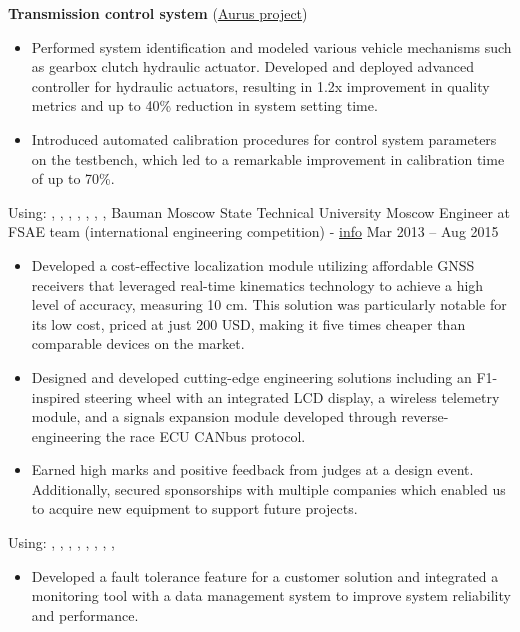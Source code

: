 \textbf{Transmission control system} (\href{https://en.wikipedia.org/wiki/Aurus_Senat}{Aurus project})
\begin{itemize}
    \item Performed system identification and modeled various vehicle mechanisms such as gearbox clutch hydraulic actuator. Developed and deployed advanced controller for hydraulic actuators, resulting in 1.2x improvement in quality metrics and up to 40\% reduction in system setting time.
    \item Introduced automated calibration procedures for control system parameters on the testbench, which led to a remarkable improvement in calibration time of up to 70\%.
\end{itemize}
Using: , , ,  , , , , 
\horizontalline
% 
\ressubheading
{Bauman Moscow State Technical University}
{}
{Moscow}
{Engineer at FSAE team (international engineering competition) - \href{https://baumanracing.ru/en/}{info}}
{Mar 2013 -- Aug 2015}
\begin{itemize}
    \item Developed a cost-effective localization module utilizing affordable GNSS receivers that leveraged real-time kinematics technology to achieve a high level of accuracy, measuring 10 cm. This solution was particularly notable for its low cost, priced at just 200 USD, making it five times cheaper than comparable devices on the market.
    \item Designed and developed cutting-edge engineering solutions including an F1-inspired steering wheel with an integrated LCD display, a wireless telemetry module, and a signals expansion module developed through reverse-engineering the race ECU CANbus protocol.
    \item Earned high marks and positive feedback from judges at a design event. Additionally, secured sponsorships with multiple companies which enabled us to acquire new equipment to support future projects.
\end{itemize}
Using: , , , , , , , , 
\horizontalline
% 
\begin{itemize}
    \item Developed a fault tolerance feature for a customer solution and integrated a monitoring tool with a data management system to improve system reliability and performance.
\end{itemize}

